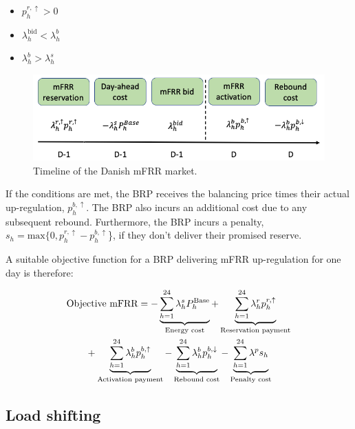 \begin{itemize}
    \item $p_{h}^{r,\uparrow} > 0$
    \item $\lambda_{h}^{\text{bid}} <  \lambda_{h}^{b}$
    \item $\lambda_{h}^{b} > \lambda_{h}^{s}$
\end{itemize}

\begin{figure}[!t]
    \centering
    \includegraphics[width=\columnwidth]{../figures/timeline_mfrr.png}
    \caption{Timeline of the Danish mFRR market.}
    \label{fig:timeline_mfrr}
\end{figure}


If the conditions are met, the BRP receives the balancing price times their actual up-regulation, $p_{h}^{b,\uparrow}$. The BRP also incurs an additional cost due to any subsequent rebound. Furthermore, the BRP incurs a penalty, $s_{h} = \text{max}\{0, p_{h}^{r,\uparrow} - p_{h}^{b,\uparrow}$\}, if they don't deliver their promised reserve.

A suitable objective function for a BRP delivering mFRR up-regulation for one day is therefore:

\begin{align}\label{eq:mFRRObjective}
     & \text{Objective mFRR} = - \underbrace{\sum_{h=1}^{24} \lambda^{s}_{h}P^{\text{Base}}_{h}}_{\textrm{Energy cost}} + \underbrace{\sum_{h=1}^{24}\lambda_{h}^{r} p^{r, \uparrow}_{h}}_{\textrm{Reservation payment}}  \notag \\ & \quad \quad + \underbrace{\sum_{h=1}^{24}  \lambda_{h}^{b} p^{b,\uparrow}_{h}}_{\textrm{Activation payment}} - \underbrace{\sum_{h=1}^{24}  \lambda_{h}^{b} p^{b,\downarrow}_{h}}_{\textrm{Rebound cost}} - \underbrace{ \sum_{h=1}^{24}  \lambda^{p}s_{h}}_{\textrm{Penalty cost}}
\end{align}


\subsection{Load shifting}


